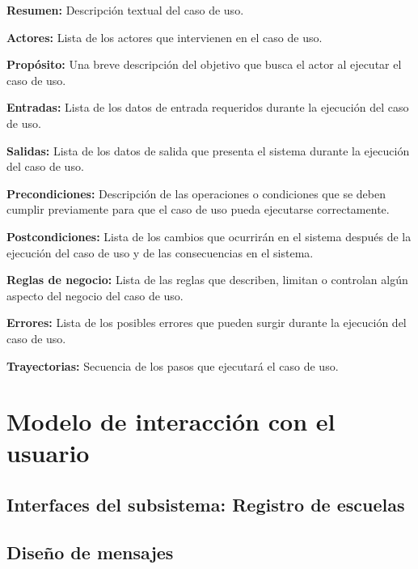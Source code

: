 \documentclass[10pt]{book}
\begin{document}
     \begin{objetivos}
	\item {\bf Resumen:} Descripción textual del caso de uso.
	\item {\bf Actores:} Lista de los actores que intervienen en el caso de uso.
	\item {\bf Propósito:} Una breve descripción del objetivo que busca el actor al ejecutar el caso de uso.
	\item {\bf Entradas:} Lista de los datos de entrada requeridos durante la ejecución del caso de uso.
	\item {\bf Salidas:} Lista de los datos de salida que presenta el sistema durante la ejecución del caso de uso.
	\item {\bf Precondiciones:} Descripción de las operaciones o condiciones que se deben cumplir previamente para que el caso de uso pueda ejecutarse correctamente.
	\item {\bf Postcondiciones:} Lista de los cambios que ocurrirán en el sistema después de la ejecución del caso de uso y de las consecuencias en el sistema.
	\item {\bf Reglas de negocio:} Lista de las reglas que describen, limitan o controlan algún aspecto del negocio del caso de uso.
	\item {\bf Errores:} Lista de los posibles errores que pueden surgir durante la ejecución del caso de uso.
	\item {\bf Trayectorias:} Secuencia de los pasos que ejecutará el caso de uso.
    \end{objetivos}

    	
\chapter{Modelo de interacción con el usuario}\label{chp:modeloInteraccionUsuario}

\section{Interfaces del subsistema: Registro de escuelas}




\section{Diseño de mensajes}

% 
% 
\end{document}
